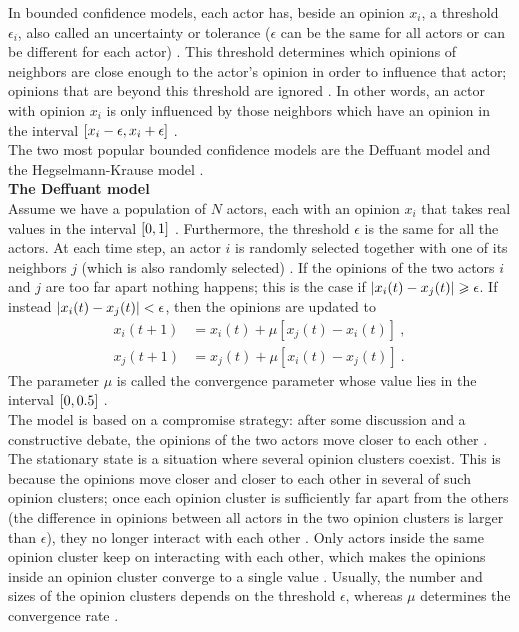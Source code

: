 \documentclass[11 pt , letterpaper , twoside , openright]{book}
\begin{document}
In bounded confidence models, each actor has, beside an opinion $x_i$, a threshold $\epsilon_i$, also called an uncertainty or tolerance ($\epsilon$ can be the same for all actors or can be different for each actor) \cite{Castellano2009}\cite{Deffuant2006}. This threshold determines which opinions of neighbors are close enough to the actor's opinion in order to influence that actor; opinions that are beyond this threshold are ignored \cite{Deffuant2006}. In other words, an actor with opinion $x_i$ is only influenced by those neighbors which have an opinion in the interval $\interval{x_i-\epsilon}{x_i+\epsilon}$ \cite{Castellano2009}. \\
\newline
The two most popular bounded confidence models are the Deffuant model and the Hegselmann-Krause model \cite{Castellano2009}. \\
\newline
\textbf{The Deffuant model}\\
\newline
Assume we have a population of $N$ actors, each with an opinion $x_i$ that takes real values in the interval $\interval{0}{1}$ \cite{Castellano2009}. Furthermore, the threshold $\epsilon$ is the same for all the actors. At each time step, an actor $i$ is randomly selected together with one of its neighbors $j$ (which is also randomly selected) \cite{Castellano2009}. If the opinions of the two actors $i$ and $j$ are too far apart nothing happens; this is the case if $\abs{x_i(t) - x_j(t)} \geqslant \epsilon$. If instead $\abs{x_i(t) - x_j(t)} < \epsilon$, then the opinions are updated to \cite{Castellano2009}\cite{Deffuant2000}
\begin{equation}
\begin{split}
	x_i(t+1) &= x_i(t) + \mu [x_j(t) - x_i(t)] \ ,\\
	x_j(t+1) &= x_j(t) + \mu [x_i(t) - x_j(t)] \ .
\end{split}
\end{equation}
The parameter $\mu$ is called the convergence parameter whose value lies in the interval $\interval{0}{0.5}$ \cite{Castellano2009}. \\
\newline
The model is based on a compromise strategy: after some discussion and a constructive debate, the opinions of the two actors move closer to each other \cite{Castellano2009}. The stationary state is a situation where several opinion clusters coexist. This is because the opinions move closer and closer to each other in several of such opinion clusters; once each opinion cluster is sufficiently far apart from the others (the difference in opinions between all actors in the two opinion clusters is larger than $\epsilon$), they no longer interact with each other \cite{Castellano2009}. Only actors inside the same opinion cluster keep on interacting with each other, which makes the opinions inside an opinion cluster converge to a single value \cite{Castellano2009}. Usually, the number and sizes of the opinion clusters depends on the threshold $\epsilon$, whereas $\mu$ determines the convergence rate \cite{Castellano2009}.\\
\end{document}
